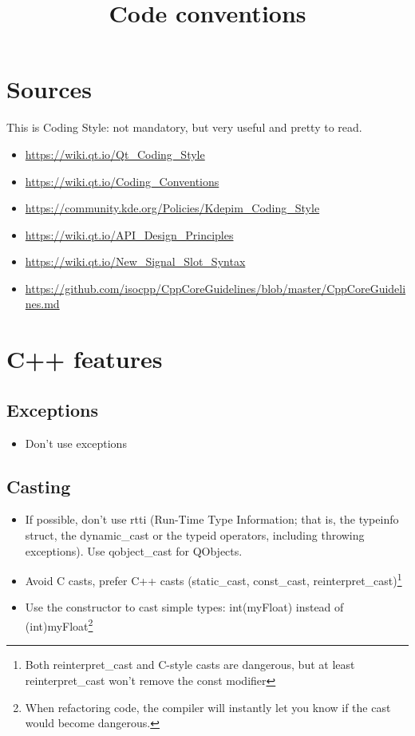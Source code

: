 \documentclass[a4paper,12pt]{article}
\begin{document}
\title{Code conventions}
\maketitle

\lstset{language=C++} 

\section{Sources}\label{sec:sources}
This is Coding Style: not mandatory, but very useful and pretty to read.

\begin{itemize}
\item  \url{https://wiki.qt.io/Qt_Coding_Style}
\item  \url{https://wiki.qt.io/Coding_Conventions}
\item \url{https://community.kde.org/Policies/Kdepim_Coding_Style}
\item \url{https://wiki.qt.io/API_Design_Principles}
\item \url{https://wiki.qt.io/New_Signal_Slot_Syntax}
\item \url{https://github.com/isocpp/CppCoreGuidelines/blob/master/CppCoreGuidelines.md}
\end{itemize}

\clearpage
\newpage

\section{C++ features}\label{sec:cpp_features}

\subsection{Exceptions}
\begin{itemize}
\item Don't use exceptions
\end{itemize}

\subsection{Casting}
\begin{itemize}
\item If possible, don't use rtti (Run-Time Type Information; that is, the typeinfo struct, the dynamic\_cast or the typeid operators, including throwing exceptions). Use qobject\_cast for QObjects.
\item Avoid C casts, prefer C++ casts (static\_cast, const\_cast, reinterpret\_cast)\footnote{Both reinterpret\_cast and C-style casts are dangerous, but at least reinterpret\_cast won't remove the const modifier}
\item Use the constructor to cast simple types: int(myFloat) instead of (int)myFloat\footnote{When refactoring code, the compiler will instantly let you know if the cast would become dangerous.}
\end{itemize}
\end{document}
